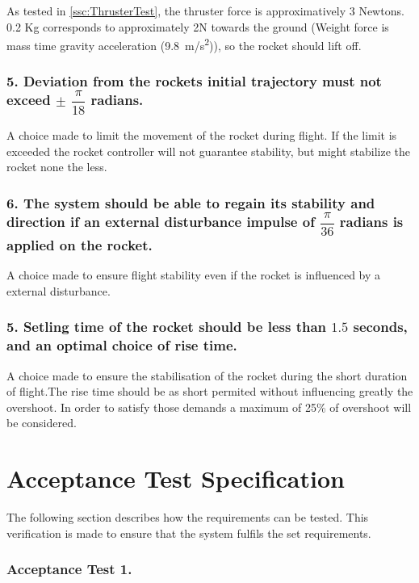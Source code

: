 As tested in \autoref{ssc:ThrusterTest}, the thruster force is approximatively 3 Newtons. 0.2 Kg corresponds to approximately 2N towards the ground (Weight force is mass time gravity acceleration (\SI{9.8}{m/s^2})), so the rocket should lift off.

\subsubsection*{5. Deviation from the rockets initial trajectory must not exceed $\pm$ $\dfrac{\pi}{18}$ radians.} 

\forceindent A choice made to limit the movement of the rocket during flight. If the limit is exceeded the rocket controller will not guarantee stability, but might stabilize the rocket none the less. 

\subsubsection*{6. The system should be able to regain its stability and direction if an external disturbance impulse of $\dfrac{\pi}{36}$ radians is applied on the rocket.} 

\forceindent  A choice made to ensure flight stability even if the rocket is influenced by a external disturbance.

\subsubsection*{5. Setling time of the rocket should be less than $1.5$ seconds, and an optimal choice of rise time.} 

\forceindent A choice made to ensure the stabilisation of the rocket during the short duration of flight.The rise time should be as short permited without influencing greatly the overshoot. In order to satisfy those demands a maximum of 25\% of overshoot will be considered. 

\section{Acceptance Test Specification}	\label{sec:TestDesc}
The following section describes how the requirements can be tested. This verification is made to ensure that the system fulfils the set requirements.

\subsubsection*{Acceptance Test 1.}


